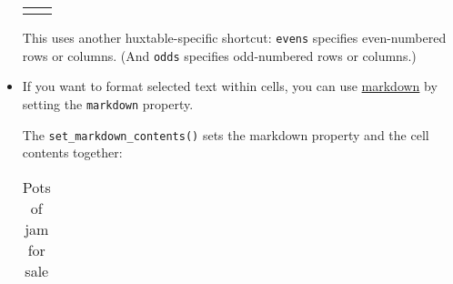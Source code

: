 \documentclass[]{article}
\newenvironment{Shaded}{\begin{snugshade}}{\end{snugshade}}
\newcommand{\DecValTok}[1]{\textcolor[rgb]{0.00,0.00,0.81}{#1}}
\newcommand{\KeywordTok}[1]{\textcolor[rgb]{0.13,0.29,0.53}{\textbf{#1}}}
\newcommand{\NormalTok}[1]{#1}
\newcommand{\OperatorTok}[1]{\textcolor[rgb]{0.81,0.36,0.00}{\textbf{#1}}}
\newcommand{\StringTok}[1]{\textcolor[rgb]{0.31,0.60,0.02}{#1}}
\begin{document}
\begin{itemize}
\begin{table}[ht]
\begin{centerbox}
\begin{threeparttable}
\begin{tabularx}{0.4\textwidth}{p{} p{}}
  \hhline{}
  \arrayrulecolor{black}
  \end{tabularx}
  \end{threeparttable}\par\end{centerbox}

  \end{table}

  \FloatBarrier

  This uses another huxtable-specific shortcut: \texttt{evens} specifies
  even-numbered rows or columns. (And \texttt{odds} specifies
  odd-numbered rows or columns.)
\item
  If you want to format selected text within cells, you can use
  \href{https://commonmark.org/help}{markdown} by setting the
  \texttt{markdown} property.

  The \texttt{set\_markdown\_contents()} sets the markdown property and
  the cell contents together:

\begin{Shaded}
\end{Shaded}


    \providecommand{\huxb}[2]{\arrayrulecolor[RGB]{#1}\global\arrayrulewidth=#2pt}
    \providecommand{\huxvb}[2]{\color[RGB]{#1}\vrule width #2pt}
    \providecommand{\huxtpad}[1]{\rule{0pt}{#1}}
    \providecommand{\huxbpad}[1]{\rule[-#1]{0pt}{#1}}

  \begin{table}[ht]
  \begin{centerbox}
  \begin{threeparttable}
  \captionsetup{justification=centering,singlelinecheck=off}
  \caption{Pots of jam for sale}
   \label{tab:unnamed-chunk-24}
  \setlength{\tabcolsep}{0pt}
  \begin{tabularx}{0.4\textwidth}{p{} p{}}



\end{tabularx}
\end{threeparttable}
\end{centerbox}
\end{table}
\end{itemize}
\end{document}

